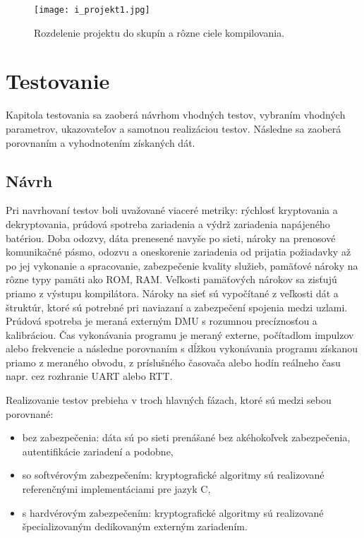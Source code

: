 \documentclass[12pt,a4wide,oneside,openright]{report}
\begin{document}
	\begin{figure*}[h]
		\centering
		\texttt{[image: i\_projekt1.jpg]}
		\caption{Rozdelenie projektu do skupín a rôzne ciele kompilovania.}
		\label{f:keil_project}
	\end{figure*}

\chapter{Testovanie} \label{s_testing}
Kapitola testovania sa zaoberá návrhom vhodných testov, vybraním vhodných parametrov, ukazovateľov a samotnou realizáciou testov. Následne sa zaoberá porovnaním a vyhodnotením získaných dát.

\section{Návrh}
Pri navrhovaní testov boli uvažované viaceré metriky: rýchlosť kryptovania a dekryptovania, prúdová spotreba zariadenia a výdrž zariadenia napájeného batériou. Doba odozvy, dáta prenesené navyše po sieti, nároky na prenosové komunikačné pásmo, odozvu a oneskorenie zariadenia od prijatia požiadavky až po jej vykonanie a spracovanie, zabezpečenie kvality služieb, pamäťové nároky na rôzne typy pamäti ako ROM, RAM.
Veľkosti pamäťových nárokov sa zisťujú priamo z výstupu kompilátora. Nároky na sieť sú vypočítané z veľkosti dát a štruktúr, ktoré sú potrebné pri naviazaní a zabezpečení spojenia medzi uzlami.
Prúdová spotreba je meraná externým DMU s rozumnou precíznosťou a kalibráciou.
Čas vykonávania programu je meraný externe, počítadlom impulzov alebo frekvencie a následne porovnaním s dĺžkou vykonávania programu získanou priamo z meraného obvodu, z príslušného časovača alebo hodín reálneho času napr. cez rozhranie UART alebo RTT.

Realizovanie testov prebieha v troch hlavných fázach, ktoré sú medzi sebou porovnané:
\singlespacing
\begin{itemize}
	\item bez zabezpečenia: dáta sú po sieti prenášané bez akéhokoľvek zabezpečenia, autentifikácie zariadení a podobne,
	\item so softvérovým zabezpečením: kryptografické algoritmy sú realizované referenčnými implementáciami pre jazyk C,
	\item s hardvérovým zabezpečením: kryptografické algoritmy sú realizované špecializovaným dedikovaným externým zariadením.
\end{itemize}
\onehalfspacing
\end{document}
